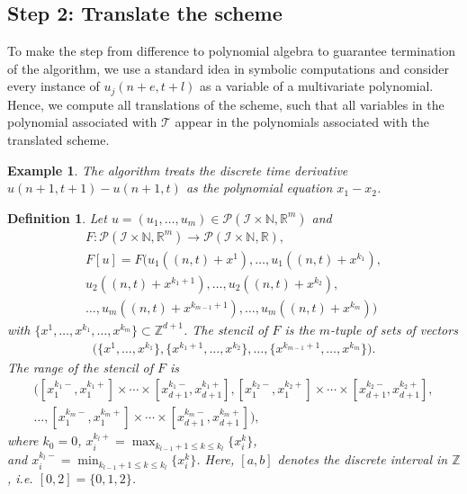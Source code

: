 \documentclass[sigconf,twocolumn]{acmart}
\newcommand{\Rr}{{\mathbb{R}}}
\newcommand{\Nn}{{\mathbb{N}}}
\newcommand{\Zz}{{\mathbb{Z}}}
\newcommand{\1}{{\chi}}
\newcommand{\Ii}{{\mathcal{I}}}
\numberwithin{equation}{section}
\theoremstyle{thmlemcorr}
\numberwithin{theorem}{section}
\theoremstyle{thmlemcorr*}
\theoremstyle{defi}
\newtheorem{definition}[theorem]{Definition}
\theoremstyle{remexample}
\newtheorem{example}[theorem]{Example}
\theoremstyle{ass}
\begin{document}
\subsection*{Step 2: Translate the scheme}
To make the step from difference to polynomial algebra to guarantee termination of the algorithm, we use a standard idea in symbolic computations and consider every instance of $u_j(n+e,t+l)$ as a variable of a multivariate polynomial.
Hence, we compute all translations of the scheme, such that all variables in the polynomial associated with $\mathcal{T}$ appear in the polynomials associated with the translated scheme.
\begin{example}
	The algorithm treats the discrete time derivative $u(n+1,t+1)-u(n+1,t)$
	as the polynomial equation $x_1-x_2$.
\end{example}
	\begin{definition}
		Let $u=(u_1,\ldots,u_m)\in\mathcal{P}(\Ii\times\Nn,\Rr^m)$ and
		\begin{gather*}
			F:
				\mathcal{P}(\Ii\times\Nn,\Rr^m)\rightarrow\mathcal{P}(\Ii\times\Nn,\Rr),\\
				F[u]=F(u_1((n,t)+x^1),\ldots,u_1((n,t)+x^{k_1}),\\
				u_2((n,t)+x^{k_1+1}),
				\ldots,u_2((n,t)+x^{k_2}),\\
				\ldots,
				u_m((n,t)+x^{k_{m-1}+1}),\ldots,u_m((n,t)+x^{k_m}))
		\end{gather*}
	\normalsize
	with $\{x^1,\ldots,x^{k_1},\ldots,x^{k_m}\}\subset\Zz^{d+1}$.
	The \emph{stencil} of $F$ is the $m$-tuple of sets of vectors
	\begin{gather*}
		\Big(\big\{x^1,\ldots,x^{k_1}\big\},
		\big\{x^{k_1+1},\ldots,x^{k_2}\big\},
		\ldots,
		\big\{x^{k_{m-1}+1},\ldots,x^{k_m}\big\}\Big).
	\end{gather*}
	The \emph{range} of the stencil of $F$ is
		\begin{gather*}
		\Big([x_1^{k_1 -},x_1^{k_1 +}]\times\cdots\times[x_{d+1}^{k_1 -},x_{d+1}^{k_1 +}],
		[x_1^{k_2 -},x_1^{k_2 +}]\times\cdots\times[x_{d+1}^{k_2 -},x_{d+1}^{k_2 +}],
		\\	\dots,
		[x_1^{k_m -},x_1^{k_m +}]\times\cdots\times[x_{d+1}^{k_m -},x_{d+1}^{k_m +}]
		\Big),
	\end{gather*}
	where $k_0=0$, $x^{k_l +}_i = \max_{k_{l-1}+1\leq k\leq k_l}\{x_i^k\}$,\\
	and $x^{k_l -}_i = \min_{k_{l-1}+1\leq k\leq k_l}\{x_i^k\}$. Here, $[a,b]$ denotes the discrete interval in $\Zz$, i.e. $[0,2]=\{0,1,2\}$.
	\end{definition}
\end{document}
